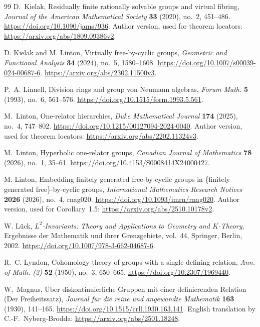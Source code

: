 \begin{thebibliography}{99}
D.~Kielak,
Residually finite rationally solvable groups and virtual fibring,
\emph{Journal of the American Mathematical Society} \textbf{33} (2020), no.~2, 451--486.
\url{https://doi.org/10.1090/jams/936}.
Author version, used for theorem locators:
\url{https://arxiv.org/abs/1809.09386v2}.

D. Kielak and M. Linton,
Virtually free-by-cyclic groups,
\emph{Geometric and Functional Analysis} \textbf{34} (2024), no.~5, 1580--1608.
\url{https://doi.org/10.1007/s00039-024-00687-6}.
\url{https://arxiv.org/abs/2302.11500v3}.

P.~A. Linnell,
Division rings and group von Neumann algebras,
\emph{Forum Math.} \textbf{5} (1993), no.~6, 561--576.
\url{https://doi.org/10.1515/form.1993.5.561}.

M.~Linton,
One-relator hierarchies,
\emph{Duke Mathematical Journal} \textbf{174} (2025), no.~4, 747--802.
\url{https://doi.org/10.1215/00127094-2024-0040}.
Author version, used for theorem locators:
\url{https://arxiv.org/abs/2202.11324v3}.

M.~Linton,
Hyperbolic one-relator groups,
\emph{Canadian Journal of Mathematics} \textbf{78} (2026), no.~1, 35--61.
\url{https://doi.org/10.4153/S0008414X24000427}.

M. Linton,
Embedding finitely generated free-by-cyclic groups in
\{finitely generated free\}-by-cyclic groups,
\emph{International Mathematics Research Notices} \textbf{2026} (2026),
no.~4, rnag020.
\url{https://doi.org/10.1093/imrn/rnag020}.
Author version, used for Corollary~1.5:
\url{https://arxiv.org/abs/2510.10178v2}.

W. L\"uck,
\emph{$L^2$-Invariants: Theory and Applications to Geometry and $K$-Theory},
Ergebnisse der Mathematik und ihrer Grenzgebiete, vol.~44,
Springer, Berlin, 2002.
\url{https://doi.org/10.1007/978-3-662-04687-6}.

R.~C. Lyndon,
Cohomology theory of groups with a single defining relation,
\emph{Ann. of Math. (2)} \textbf{52} (1950), no.~3, 650--665.
\url{https://doi.org/10.2307/1969440}.

W.~Magnus,
\"Uber diskontinuierliche Gruppen mit einer definierenden Relation
(Der Freiheitssatz),
\emph{Journal f\"ur die reine und angewandte Mathematik}
\textbf{163} (1930), 141--165.
\url{https://doi.org/10.1515/crll.1930.163.141}.
English translation by C.-F.~Nyberg-Brodda:
\url{https://arxiv.org/abs/2501.18248}.


\end{thebibliography}
